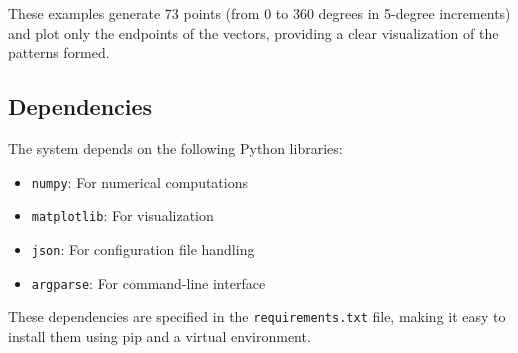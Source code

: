 These examples generate 73 points (from 0 to 360 degrees in 5-degree increments) and plot only the endpoints of the vectors, providing a clear visualization of the patterns formed.

\subsection{Dependencies}

The system depends on the following Python libraries:

\begin{itemize}
    \item \texttt{numpy}: For numerical computations
    \item \texttt{matplotlib}: For visualization
    \item \texttt{json}: For configuration file handling
    \item \texttt{argparse}: For command-line interface
\end{itemize}

These dependencies are specified in the \texttt{requirements.txt} file, making it easy to install them using pip and a virtual environment.
